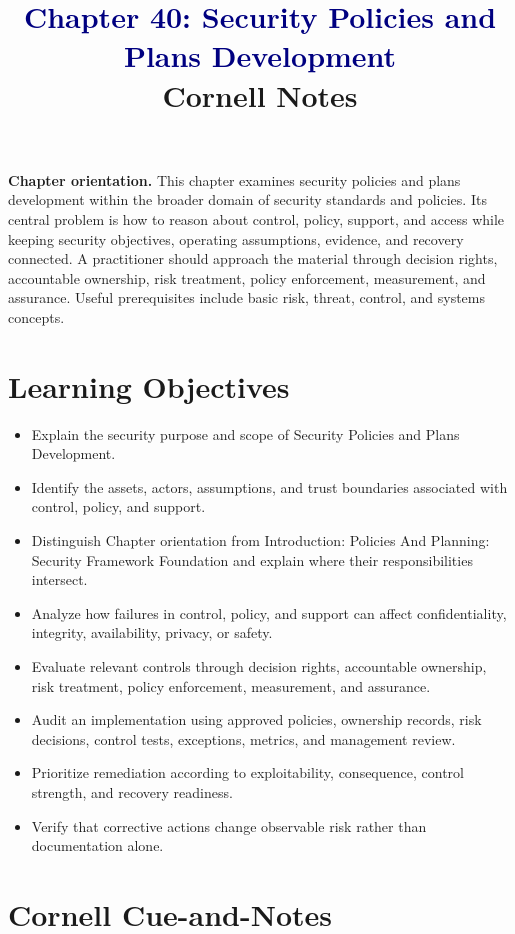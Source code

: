 \documentclass[11pt]{article}
\title{\textcolor{Navy}{Chapter 40: Security Policies and Plans Development}\\[2mm]\large Cornell Notes}
\author{}
\date{}
\begin{document}
\maketitle
\thispagestyle{fancy}
\vspace{-1.5em}
\begin{orientationbox}
\textbf{Chapter orientation.} This chapter examines security policies and plans development within the broader domain of security standards and policies. Its central problem is how to reason about control, policy, support, and access while keeping security objectives, operating assumptions, evidence, and recovery connected. A practitioner should approach the material through decision rights, accountable ownership, risk treatment, policy enforcement, measurement, and assurance. Useful prerequisites include basic risk, threat, control, and systems concepts.
\end{orientationbox}
\section*{Learning Objectives}
\begin{itemize}
\item Explain the security purpose and scope of Security Policies and Plans Development.
\item Identify the assets, actors, assumptions, and trust boundaries associated with control, policy, and support.
\item Distinguish Chapter orientation from Introduction: Policies And Planning: Security Framework Foundation and explain where their responsibilities intersect.
\item Analyze how failures in control, policy, and support can affect confidentiality, integrity, availability, privacy, or safety.
\item Evaluate relevant controls through decision rights, accountable ownership, risk treatment, policy enforcement, measurement, and assurance.
\item Audit an implementation using approved policies, ownership records, risk decisions, control tests, exceptions, metrics, and management review.
\item Prioritize remediation according to exploitability, consequence, control strength, and recovery readiness.
\item Verify that corrective actions change observable risk rather than documentation alone.
\end{itemize}
\section*{Cornell Cue-and-Notes}
\end{document}
